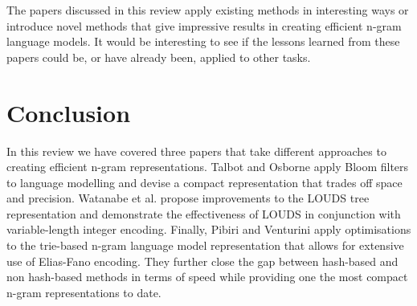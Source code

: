 \documentclass[sigconf, nonacm=true]{acmart}
\begin{document}
The papers discussed in this review apply existing methods in interesting ways or introduce novel methods that give impressive results in creating efficient n-gram language models. It would be interesting to see if the lessons learned from these papers could be, or have already been, applied to other tasks.

\section{Conclusion}
In this review we have covered three papers that take different approaches to creating efficient n-gram representations. Talbot and Osborne apply Bloom filters to language modelling and devise a compact representation that trades off space and precision. Watanabe et al. propose improvements to the LOUDS tree representation and demonstrate the effectiveness of LOUDS in conjunction with variable-length integer encoding. Finally, Pibiri and Venturini apply optimisations to the trie-based n-gram language model representation that allows for extensive use of Elias-Fano encoding. They further close the gap between hash-based and non hash-based methods in terms of speed while providing one the most compact n-gram representations to date.

%


\end{document}
